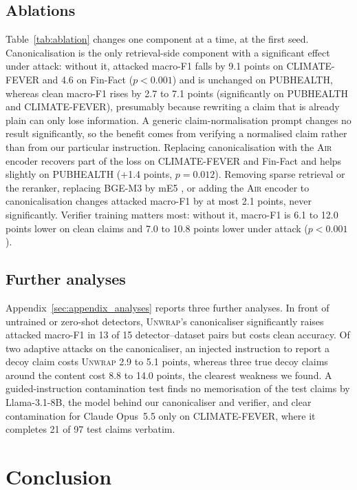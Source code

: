 \documentclass[11pt]{article}
\newcommand{\method}{\textsc{Unwrap}}
\newcommand{\air}{\textsc{Air}}
\begin{document}
\subsection{Ablations}
\label{sec:ablation}

Table~\ref{tab:ablation} changes one component at a time, at the first seed. Canonicalisation is the only retrieval-side component with a significant effect under attack: without it, attacked macro-F1 falls by 9.1 points on CLIMATE-FEVER and 4.6 on Fin-Fact ($p<0.001$) and is unchanged on PUBHEALTH, whereas clean macro-F1 rises by 2.7 to 7.1 points (significantly on PUBHEALTH and CLIMATE-FEVER), presumably because rewriting a claim that is already plain can only lose information. A generic claim-normalisation prompt \citep{sundriyal2023claimnorm} changes no result significantly, so the benefit comes from verifying a normalised claim rather than from our particular instruction. Replacing canonicalisation with the \air{} encoder recovers part of the loss on CLIMATE-FEVER and Fin-Fact and helps slightly on PUBHEALTH (+1.4 points, $p=0.012$). Removing sparse retrieval or the reranker, replacing BGE-M3 by mE5 \citep{wang2024me5}, or adding the \air{} encoder to canonicalisation changes attacked macro-F1 by at most 2.1 points, never significantly. Verifier training matters most: without it, macro-F1 is 6.1 to 12.0 points lower on clean claims and 7.0 to 10.8 points lower under attack ($p<0.001$).

\subsection{Further analyses}

Appendix~\ref{sec:appendix_analyses} reports three further analyses. In front of untrained or zero-shot detectors, \method{}'s canonicaliser significantly raises attacked macro-F1 in 13 of 15 detector--dataset pairs but costs clean accuracy. Of two adaptive attacks on the canonicaliser, an injected instruction to report a decoy claim costs \method{} 2.9 to 5.1 points, whereas three true decoy claims around the content cost 8.8 to 14.0 points, the clearest weakness we found. A guided-instruction contamination test \citep{golchin2024timetravel} finds no memorisation of the test claims by Llama-3.1-8B, the model behind our canonicaliser and verifier, and clear contamination for Claude Opus~5.5 only on CLIMATE-FEVER, where it completes 21 of 97 test claims verbatim.

\section{Conclusion}
\end{document}
